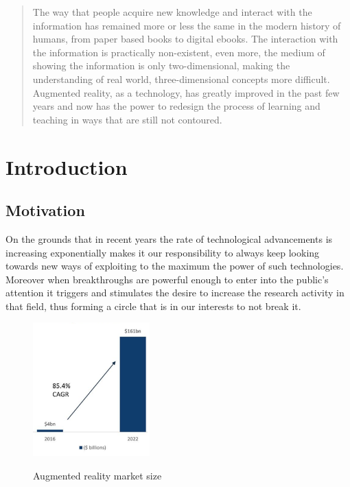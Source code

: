 \documentclass[12 pct]{report}
\begin{document}
\begin{abstract}
The way that people acquire new knowledge and interact with the information has remained more or less the same in the modern history of humans, from paper based books to digital ebooks. The interaction with the information is practically non-existent, even more, the medium of showing the information is only two-dimensional, making the understanding of real world, three-dimensional concepts more difficult. Augmented reality, as a technology, has greatly improved in the past few years and now has the power to redesign the process of learning and teaching in ways that are still not contoured.
\end{abstract}

\tableofcontents

\listoffigures

\listoftables

\chapter{Introduction}

\section{Motivation}
On the grounds that in recent years the rate of technological advancements is increasing exponentially makes it our responsibility to always keep looking towards new ways of exploiting to the maximum the power of such technologies. Moreover when breakthroughs are powerful enough to enter into the public's attention it triggers and stimulates the desire to increase the research activity in that field, thus forming a circle that is in our interests to not break it.

\begin{figure}[H]
\includegraphics[width=0.4\textwidth]{ar-chart}
\centering
\label{fig:feature-points}
\caption{Augmented reality market size \cite{consultancy}}
\end{figure}
\end{document}
